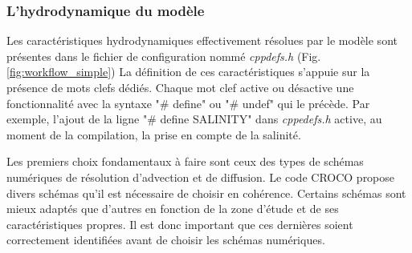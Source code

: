 \documentclass[10pt,a4paper,titlepage]{article}
\begin{document}

\subsubsection{L'hydrodynamique du modèle}
\label{subsub:physique_modele}

Les caractéristiques hydrodynamiques effectivement résolues par le modèle sont présentes dans le fichier de configuration nommé \textit{cppdefs.h} (Fig. \ref{fig:workflow_simple})
La définition de ces caractéristiques s'appuie sur la présence de mots clefs dédiés.
Chaque mot clef active ou désactive une fonctionnalité avec la syntaxe "\# define"  ou "\# undef" qui le précède.
Par exemple, l'ajout de la ligne "\# define SALINITY" dans \textit{cppedefs.h} active, au moment de la compilation, la prise en compte de la salinité.



Les premiers choix fondamentaux à faire sont ceux des types de schémas numériques de résolution d'advection et de diffusion.
Le code CROCO propose divers schémas qu'il est nécessaire de choisir en cohérence. %
Certains schémas sont mieux adaptés que d'autres en fonction de la zone d'étude et de ses caractéristiques propres.
Il est donc important que ces dernières soient correctement identifiées avant de choisir les schémas numériques.
\end{document}
